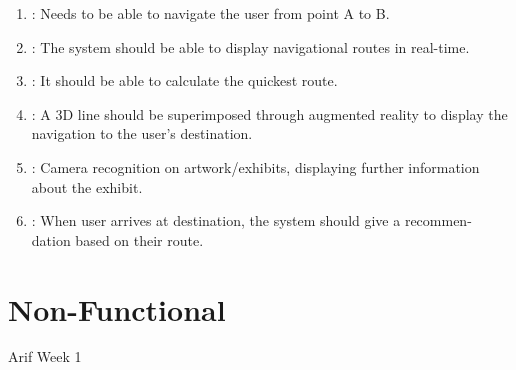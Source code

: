 
\begin{enumerate}
	\item \textbf{}: Needs to be able to navigate the user from point A to B.
	\item \textbf{}: The system should be able to display navigational routes in real-time.
	\item \textbf{}: It should be able to calculate the quickest route.
	\item \textbf{}: A 3D line should be superimposed through augmented reality to display the navigation to the user’s destination.
	\item \textbf{}: Camera recognition on artwork/exhibits, displaying further information about the exhibit.
	\item \textbf{}: When user arrives at destination, the system should give a recommen- dation based on their route.
\end{enumerate}

\section{Non-Functional}
Arif Week 1

